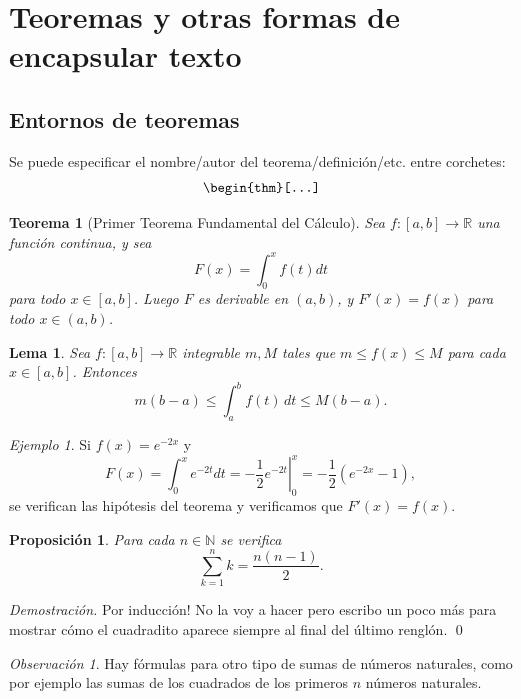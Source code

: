 \documentclass[12pt, spanish]{article}
\theoremstyle{definition} %
\providecommand{\remarkname}{Observación}
\theoremstyle{remark} %
\newtheorem{rem}[defn]{\protect\remarkname}
\providecommand{\theoremname}{Teorema}
\theoremstyle{plain} %
\newtheorem{thm}[defn]{\protect\theoremname}
\theoremstyle{plain} %
\providecommand{\lemmaname}{Lema}
\theoremstyle{plain} %
\newtheorem{lem}[defn]{\protect\lemmaname}
\providecommand{\propositionname}{Proposición}
\theoremstyle{plain} %
\newtheorem{prop}[defn]{\protect\propositionname}
\theoremstyle{plain} %
\providecommand{\examplename}{Ejemplo}
\theoremstyle{remark} %
\newtheorem{example}[defn]{\protect\examplename}
\newenvironment{dem}{\noindent\textit{Demostración.}}{\hfill\qed\par\vspace{10pt}}
\newcommand{\real}[0]{\mathbb{R}} %
\newcommand{\nat}[0]{\mathbb{N}} %
\begin{document}
\begin{itemize}
\end{itemize}

\section{Teoremas y otras formas de encapsular texto}

\subsection{Entornos de teoremas}

Se puede especificar el nombre/autor del teorema/definición/etc. entre corchetes:
\[
    \verb|\begin{thm}[...]|
\]

\begin{thm}[Primer Teorema Fundamental del Cálculo]
    Sea $f:[a, b]\to\real$ una función continua, y sea
    \[
    F(x) = \int_0^x f(t) dt
    \]
    para todo $x \in [a,b]$. Luego $F$ es derivable en $(a,b)$, y $F'(x) = f(x)$ para todo $x \in (a,b)$.
\end{thm}

\begin{lem}
    Sea $f:[a, b]\to\real$ integrable $m, M$ tales que $m \leq f(x) \leq M$ para cada $x \in [a,b]$. Entonces
    \[
    m(b-a) \leq \int_a^b f(t)\, dt \leq M(b-a).
    \]
\end{lem}

\begin{example}
    Si $f(x) = e^{-2x}$ y
    \[
        F(x) = \int_0^x e^{-2t} dt = \left.-\frac{1}{2}e^{-2t}\right|_0^x = -\frac{1}{2}(e^{-2x} - 1),
    \]
    se verifican las hipótesis del teorema y verificamos que $F'(x) = f(x)$.
\end{example}

\begin{prop}
    Para cada $n\in\nat$ se verifica
    \[
        \sum_{k=1}^n k = \frac{n(n-1)}{2}.
    \]
\end{prop}
\begin{dem}
    Por inducción! No la voy a hacer pero escribo un poco más para mostrar cómo el cuadradito aparece siempre al final del último renglón.
\end{dem}

\begin{rem}
    Hay fórmulas para otro tipo de sumas de números naturales, como por ejemplo las sumas de los cuadrados de los primeros $n$ números naturales.
\end{rem}
\end{document}
